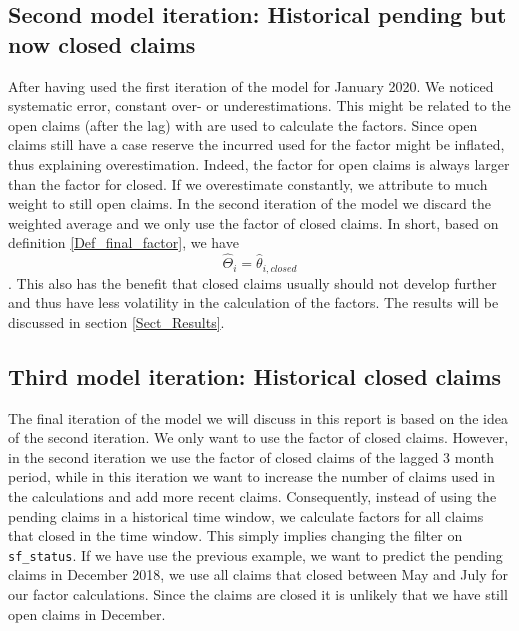 \subsection{Second model iteration: Historical pending but now closed claims}
After having used the first iteration of the model for January 2020. We noticed systematic error, constant over- or underestimations. This might be related to the open claims (after the lag) with are used to calculate the factors. Since open claims still have a case reserve the incurred used for the factor might be inflated, thus explaining overestimation. Indeed, the factor for open claims is always larger than the factor for closed. If we overestimate constantly, we attribute to much weight to still open claims. In the second iteration of the model we discard the weighted average and we only use the factor of closed claims. In short, based on definition \ref{Def_final_factor}, we have
$$\hat{\Theta}_i = \hat{\theta}_{i,closed}$$.
This also has the benefit that closed claims usually should not develop further and thus have less volatility in the calculation of the factors. The results will be discussed in section \ref{Sect_Results}.
\subsection{Third model iteration: Historical closed claims}
The final iteration of the model we will discuss in this report is based on the idea of the second iteration. We only want to use the factor of closed claims. However, in the second iteration we use the factor of closed claims of the lagged 3 month period, while in this iteration we want to increase the number of claims used in the calculations and add more recent claims. Consequently, instead of using the pending claims in a historical time window, we calculate factors for all claims that closed in the time window. This simply implies changing the filter on \texttt{sf\_status}. If we have use the previous example, we want to predict the pending claims in December 2018, we use all claims that closed between May and July for our factor calculations. Since the claims are closed it is unlikely that we have still open claims in December.
